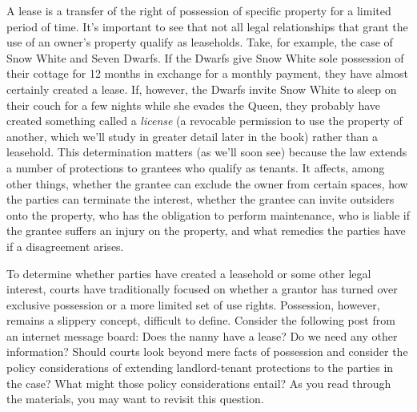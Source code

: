 A lease is a transfer of the right of possession of specific property for a
limited period of time.  It's important to see that not all legal relationships
that grant the use of an owner's property qualify as leaseholds.  Take, for
example, the case of Snow White and Seven Dwarfs.  If the Dwarfs give Snow
White sole possession of their cottage for 12 months in exchange for a monthly
payment, they have almost certainly created a lease.  If, however, the Dwarfs
invite Snow White to sleep on their couch for a few nights while she evades the
Queen, they probably have created something called a \textit{license} (a
revocable permission to use the property of another, which we'll study in
greater detail later in the book) rather than a leasehold.  This determination
matters (as we'll soon see) because the law extends a number of protections to
grantees who qualify as tenants. It affects, among other things, whether the
grantee can exclude the owner from certain spaces, how the parties can
terminate the interest, whether the grantee can invite outsiders onto the
property, who has the obligation to perform maintenance, who is liable if the
grantee suffers an injury on the property, and what remedies the parties have
if a disagreement arises.

To determine whether parties have created a leasehold or some other legal
interest, courts have traditionally focused on whether a grantor has turned
over exclusive possession or a more limited set of use rights.  Possession,
however, remains a slippery concept, difficult to define. Consider the
following post from an internet message board:  
Does the nanny have a lease?  Do we need any other information? Should courts
look beyond mere facts of possession and consider the policy considerations of
extending landlord-tenant protections to the parties in the case?  What might
those policy considerations entail?  As you read through the materials, you may
want to revisit this question.

